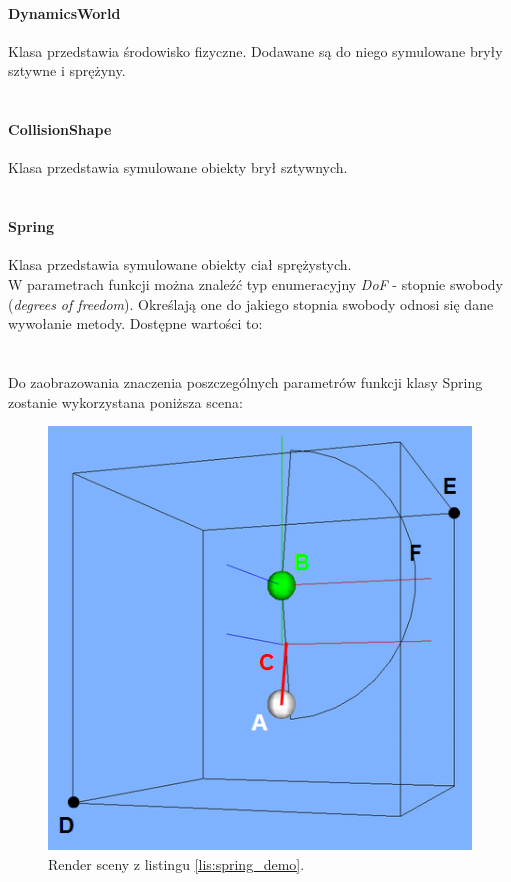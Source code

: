 \paragraph{DynamicsWorld}
Klasa przedstawia środowisko fizyczne. Dodawane są do niego symulowane bryły
sztywne i sprężyny.\\ \\


\paragraph{CollisionShape}
Klasa przedstawia symulowane obiekty brył sztywnych.\\ \\


\paragraph{Spring}\label{sec:spring}
Klasa przedstawia symulowane obiekty ciał sprężystych.\\
W parametrach funkcji można znaleźć typ enumeracyjny \emph{DoF} -
stopnie swobody (\emph{degrees of freedom}). Określają one do jakiego stopnia
swobody odnosi się dane wywołanie metody. Dostępne wartości to:\\

\\ \\
Do zaobrazowania znaczenia poszczególnych parametrów funkcji klasy Spring
zostanie wykorzystana poniższa scena:\\



\begin{figure}
\centering
\includegraphics[scale = 0.6]{./img/Spring-render.png}
\caption{Render sceny z listingu \ref{lis:spring_demo}.}
\label{fig:spring_demo}
\end{figure}

